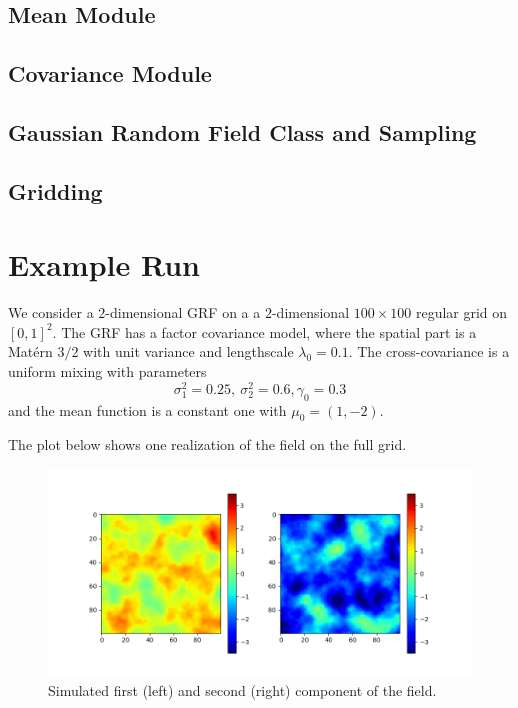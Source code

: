 \documentclass[a4paper,10pt]{article}
\begin{document}
\subsection{Mean Module}
\subsection{Covariance Module}
\subsection{Gaussian Random Field Class and Sampling}
\subsection{Gridding}

\newpage

\section{Example Run}
We consider a $2$-dimensional GRF on a a $2$-dimensional $100\times 100$ regular grid on
$[0,1]^2$. The GRF has a factor covariance model, where the spatial part is a
Mat\'{e}rn $3/2$ with unit variance and lengthscale $\lambda_0 = 0.1$. The
cross-covariance is a uniform mixing with parameters
\[
    \sigma_1^2 = 0.25,~\sigma_2^2 = 0.6, \gamma_0 = 0.3
\]
and the mean function is a constant one with $\mu_0=(1, -2)$.
\medskip

The plot below shows one realization of the field on the full grid.
\begin{figure}[tbh!p]
\centering
\includegraphics[scale=0.65]{images/sample_low_correlation.png}
\caption{Simulated first (left) and second (right) component of the field.}
\end{figure}
\end{document}
